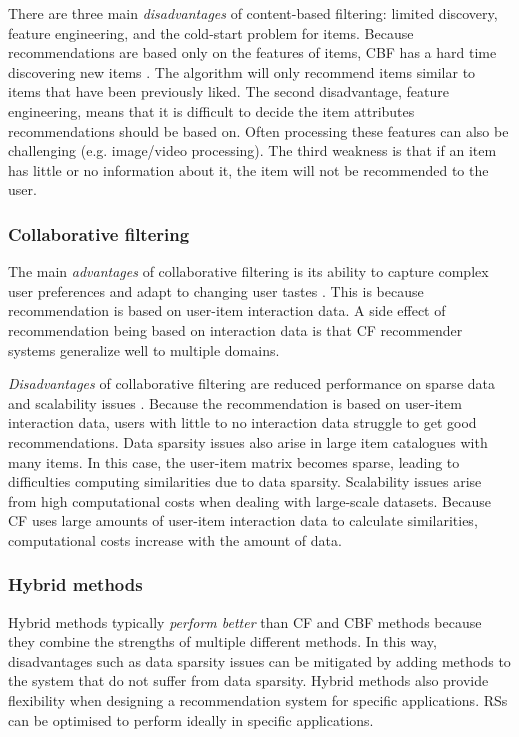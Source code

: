 \documentclass[english, 12pt, a4paper, sci, utf8, a-2b, online]{aaltothesis}
\begin{document}
There are three main \textit{disadvantages} of content-based filtering: limited discovery, feature engineering, and the cold-start problem for items. Because recommendations are based only on the features of items, CBF has a hard time discovering new items \parencite{al2024traditional}. The algorithm will only recommend items similar to items that have been previously liked. The second disadvantage, feature engineering, means that it is difficult to decide the item attributes recommendations should be based on. Often processing these features can also be challenging (e.g. image/video processing). The third weakness is that if an item has little or no information about it, the item will not be recommended to the user. 

\subsubsection{Collaborative filtering}

The main \textit{advantages} of collaborative filtering is its ability to capture complex user preferences and adapt to changing user tastes \parencite{al2024traditional}. This is because recommendation is based on user-item interaction data. A side effect of recommendation being based on interaction data is that CF recommender systems generalize well to multiple domains.

\textit{Disadvantages} of collaborative filtering are reduced performance on sparse data and scalability issues \parencite{jetti2025knowledge}. Because the recommendation is based on user-item interaction data, users with little to no interaction data struggle to get good recommendations. Data sparsity issues also arise in large item catalogues with many items. In this case, the user-item matrix becomes sparse, leading to difficulties computing similarities due to data sparsity. Scalability issues arise from high computational costs when dealing with large-scale datasets. Because CF uses large amounts of user-item interaction data to calculate similarities, computational costs increase with the amount of data. 

\subsubsection{Hybrid methods}

Hybrid methods typically \textit{perform better} than CF and CBF methods because they combine the strengths of multiple different methods. In this way, disadvantages such as data sparsity issues can be mitigated by adding methods to the system that do not suffer from data sparsity. Hybrid methods also provide flexibility when designing a recommendation system for specific applications. RSs can be optimised to perform ideally in specific applications. 
\end{document}

